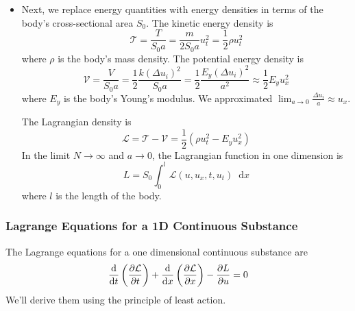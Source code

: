 \documentclass[11pt, a4paper]{article}
\newcommand{\diff}{\mathop{}\!\mathrm{d}} %
\begin{document}
\begin{itemize}
	\item Next, we replace energy quantities with energy densities in terms of the body's cross-sectional area $ S_{0} $. The kinetic energy density is
	\begin{equation*}
		\mathcal{T} = \frac{T}{S_{0}a} = \frac{m}{2S_{0}a}u_{t}^{2} = \frac{1}{2}\rho u_{t}^{2}
	\end{equation*}
	where $ \rho  $ is the body's mass density. The potential energy density is
	\begin{equation*}
		\mathcal{V} = \frac{V}{S_{0}a} = \frac{1}{2}\frac{k(\Delta u_{i})^{2}}{S_{0}a} = \frac{1}{2}\frac{E_{y}(\Delta u_{i})^{2}}{a^{2}} \approx \frac{1}{2}E_{y}u_{x}^{2}
	\end{equation*}
	where $ E_{y} $ is the body's Young's modulus. We approximated $ \lim_{a \to 0} \frac{\Delta u_{i}}{a} \approx u_{x} $.
	
	The Lagrangian density is
	\begin{equation*}
		\mathcal{L} = \mathcal{T} - \mathcal{V} = \frac{1}{2}\left(\rho u_{t}^{2} - E_{y}u_{x}^{2}\right)
	\end{equation*}
	In the limit $ N \to \infty $ and $ a \to 0 $, the Lagrangian function in one dimension is
	\begin{equation*}
		L = S_{0}\int_{0}^{l} \mathcal{L}(u, u_{x}, t, u_{t}) \diff x
	\end{equation*}
	where $ l $ is the length of the body.
\end{itemize}


\subsubsection{Lagrange Equations for a 1D Continuous Substance}
The Lagrange equations for a one dimensional continuous substance are
\begin{equation*}
	\dv{}{t}\left(\pdv{\mathcal{L}}{t}\right) + \dv{}{x}\left(\pdv{\mathcal{L}}{x}\right) - \pdv{L}{u} = 0
\end{equation*}
We'll derive them using the principle of least action.
\end{document}
